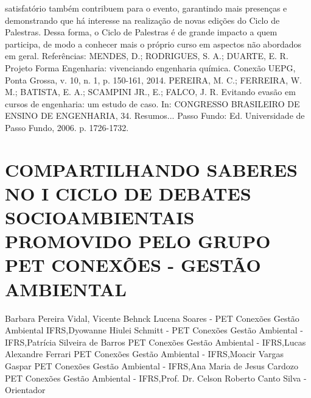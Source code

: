 satisfatório também contribuem para o evento, garantindo mais presenças e demonstrando que há 
interesse na realização de novas edições do Ciclo de Palestras.
Dessa forma, o Ciclo de Palestras é de grande impacto a quem participa, de modo a 
conhecer mais o próprio curso em aspectos não abordados em geral.
Referências:
MENDES, D.; RODRIGUES, S. A.; DUARTE, E. R. Projeto Forma Engenharia: vivenciando 
engenharia química. Conexão UEPG, Ponta Grossa, v. 10, n. 1, p. 150-161, 2014.
PEREIRA, M. C.; FERREIRA, W. M.; BATISTA, E. A.; SCAMPINI JR., E.; FALCO, J. R. 
Evitando evasão em cursos de engenharia: um estudo de caso. In: CONGRESSO BRASILEIRO 
DE ENSINO DE ENGENHARIA, 34. Resumos... Passo Fundo: Ed. Universidade de Passo 
Fundo, 2006. p. 1726-1732.



\section{COMPARTILHANDO SABERES NO I CICLO DE DEBATES SOCIOAMBIENTAIS PROMOVIDO PELO GRUPO PET CONEXÕES - GESTÃO AMBIENTAL}

Barbara Pereira Vidal, Vicente Behnck Lucena Soares - PET Conexões Gestão Ambiental IFRS,Dyowanne Hiulei Schmitt - PET Conexões Gestão Ambiental - IFRS,Patrícia Silveira de Barros PET Conexões Gestão Ambiental - IFRS,Lucas Alexandre Ferrari PET Conexões Gestão Ambiental - IFRS,Moacir Vargas Gaspar PET Conexões Gestão Ambiental - IFRS,Ana Maria de Jesus Cardozo PET Conexões Gestão Ambiental - IFRS,Prof. Dr. Celson Roberto Canto Silva - Orientador


